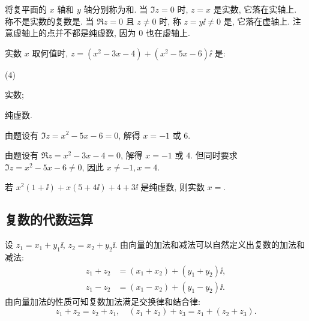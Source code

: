将复平面的 $x$ 轴和 $y$ 轴分别称为和.
当 $\Im z=0$ 时, $z=x$ 是实数, 它落在实轴上.
称不是实数的复数是.
当 $\Re z=0$ 且 $z\neq 0$ 时, 称 $z=y\ii\neq 0$ 是, 它落在虚轴上.
  \alert{注意虚轴上的点并不都是纯虚数, 因为 $0$ 也在虚轴上.}

\begin{example}
  实数 $x$ 取何值时, $z=(x^2-3x-4)+(x^2-5x-6)\ii$ 是:
  \begin{subexample}(4)
    \item 实数;
    \item 纯虚数.
  \end{subexample}
\end{example}

\begin{solutionenum}
  \item 由题设有 $\Im z=x^2-5x-6=0$, 解得 $x=-1$ 或 $6$.
  \item 由题设有 $\Re z=x^2-3x-4=0$, 解得 $x=-1$ 或 $4$.
  但同时要求 $\Im z=x^2-5x-6\neq 0$, 因此 $x\neq -1, x=4$.
\end{solutionenum}

\begin{exercise}
  若 $x^2(1+\ii)+x(5+4\ii)+4+3\ii$ 是纯虚数, 则实数 $x=$\fillblank{}.
\end{exercise}


\subsection{复数的代数运算}

设 $z_1=x_1+y_1\ii$, $z_2=x_2+y_2\ii$.
由向量的加法和减法可以自然定义出复数的加法和减法:
\begin{align*}
  z_1+z_2&=(x_1+x_2)+(y_1+y_2)\ii,\\
  z_1-z_2&=(x_1-x_2)+(y_1-y_2)\ii.
\end{align*}
由向量加法的性质可知复数加法满足交换律和结合律:
\[
  z_1+z_2=z_2+z_1,\quad (z_1+z_2)+z_3=z_1+(z_2+z_3).
\]

